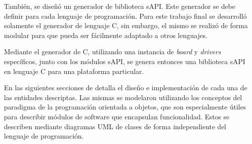 También, se diseñó un generador de biblioteca sAPI. Este generador se debe definir para cada lenguaje de programación. Para este trabajo final se desarrolló solamente el generador de lenguaje C, sin embargo, el mismo se realizó de forma modular para que pueda ser fácilmente adaptado a otros lenguajes. 

Mediante el generador de C, utilizando una instancia de \emph{board} y \emph{drivers} específicos, junto con los módulos sAPI, se genera entonces una biblioteca sAPI en lenguaje C para una plataforma particular.

En las siguientes secciones de detalla el diseño e implementación de cada una de las entidades descriptas. Las mismas se modelaron utilizando los conceptos del paradigma de la programación orientada a objetos, que son especialmente útiles para describir módulos de software que encapsulan funcionalidad. Estos se describen mediante diagramas UML de clases de forma independiente del lenguaje de programación.
